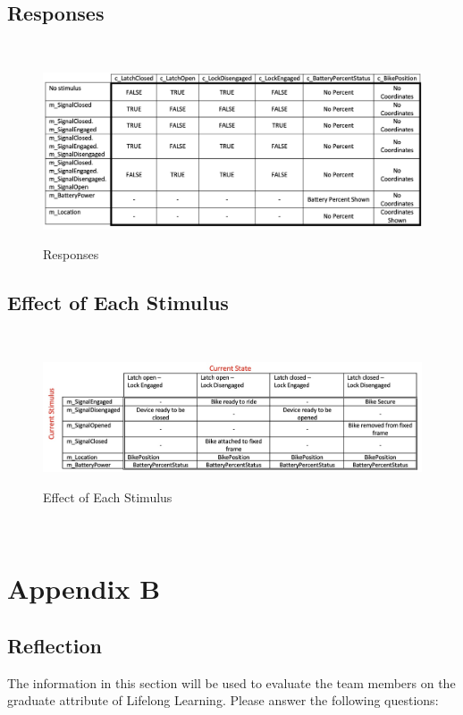 \documentclass[12pt]{article}
\begin{document}
\subsection{Responses}
~\newline
\begin{figure}[h!]
 \begin{center}
 {
 \includegraphics[width=0.9\linewidth]{./Responses.jpeg}
 }
 \caption{\label{Responses} Responses}
 \end{center}
 \end{figure}
\subsection{Effect of Each Stimulus}
~\newline
\begin{figure}[h!]
 \begin{center}
 {
 \includegraphics[width=0.9\linewidth]{./EffectofEachStimulus.jpeg}
 }
 \caption{\label{Effect of Each Stimulus} Effect of Each Stimulus}
 \end{center}
 \end{figure}
~\newpage
\section{Appendix B}
\subsection{Reflection}

The information in this section will be used to evaluate the team members on the graduate attribute of Lifelong Learning.  Please answer the following questions:
\end{document}
